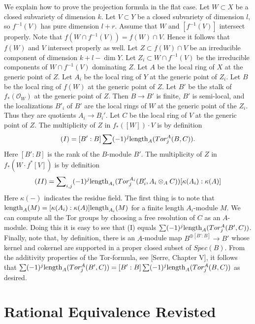 \medskip\noindent
We explain how to prove the projection formula in the flat case.
Let $W \subset X$ be a closed subvariety of dimension $k$.
Let $V \subset Y$ be a closed subvariety of dimension $l$,
so $f^{-1}(V)$ has pure dimension $l+r$.
Assume that $W$ and $[f^{-1}(V)]$ intersect properly. Note that
$f(W \cap f^{-1}(V)) = f(W) \cap V$. Hence it follows
that $f(W)$ and $V$ intersect properly as well. Let
$Z \subset f(W) \cap V$ be an irreducible component
of dimension $k+l-\dim Y$. Let $Z_i \subset W\cap f^{-1}(V)$
be the irreducible components of $W\cap f^{-1}(V)$
dominating $Z$. 
Let $A$ be the local ring of $X$ at the generic point of $Z$.
Let $A_i$ be the local ring of $Y$ at the generic point of $Z_i$.
Let $B$ be the local ring of $f(W)$ at the generic point of $Z$.
Let $B'$ be the stalk of $f_*({\mathcal O}_W)$ at the generic point
of $Z$. Then $B \to B'$ is finite, $B'$ is semi-local, and the
localizations $B'_i$ of $B'$ are the local rings of $W$ at the generic
point of the $Z_i$. Thus they are quotients $A_i \to B_i'$.
Let $C$ be the local ring of $V$ at the generic point of $Z$.
The multiplicity of $Z$ in $f_*([W])\cdot V$ is by definition
$$
(I) = [B' : B] \sum (-1)^j \hbox{length}_{A}(Tor^A_j(B,C)).
$$
Here $[B':B]$ is the rank of the $B$-module $B'$.
The multiplicity of $Z$ in $f_*( W \cdot f^*[V])$ is
by definition
$$
(II) = \sum\nolimits_{i,j} (-1)^j
\hbox{length}_{A_i}(Tor^{A_i}_j(B'_i, A_i\otimes_A C))
[\kappa(A_i):\kappa(A)]
$$
Here $\kappa(-)$ indicates the residue field.
The first thing is to note that
$\hbox{length}_A(M) = [\kappa(A_i):\kappa(A)]\hbox{length}_{A_i}(M)$
for a finite length $A_i$-module $M$.
We can compute all the Tor groups by choosing a free resolution
of $C$ as an $A$-module. Doing this it is easy to see that
(I) equals $\sum (-1)^j \hbox{length}_{A}(Tor^A_j(B', C))$.
Finally, note that, by definition, there is an $A$-module map
$B^{\oplus [B':B]} \to B'$ whose kernel and cokernel are
supported in a proper closed subset of $Spec(B)$. From the
additivity properties of the Tor-formula, see [Serre, Chapter V],
it follows that $\sum (-1)^j \hbox{length}_{A}(Tor^A_j(B', C)) =
[B':B] \sum (-1)^j \hbox{length}_{A}(Tor^A_j(B, C))$ as desired.

\section{Rational Equivalence Revisted}
\label{section-equivalence-revisited}

